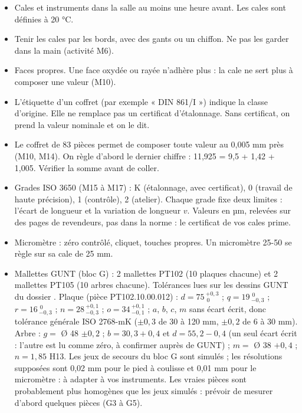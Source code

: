 \documentclass[10pt,a4paper]{article}
\begin{document}
\begin{itemize}
\item Cales et instruments dans la salle au moins une heure avant. Les cales sont définies à 20 °C.
\item Tenir les cales par les bords, avec des gants ou un chiffon. Ne pas les garder dans la main (activité M6).
\item Faces propres. Une face oxydée ou rayée n'adhère plus : la cale ne sert plus à composer une valeur (M10).
\item L'étiquette d'un coffret (par exemple « DIN 861/I ») indique la classe d'origine. Elle ne remplace pas un certificat d'étalonnage. Sans certificat, on prend la valeur nominale et on le dit.
\item Le coffret de 83 pièces permet de composer toute valeur au 0,005 mm près (M10, M14). On règle d'abord le dernier chiffre : 11,925 = 9,5 + 1,42 + 1,005. Vérifier la somme avant de coller.
\item Grades ISO 3650 (M15 à M17) : K (étalonnage, avec certificat), 0 (travail de haute précision), 1 (contrôle), 2 (atelier). Chaque grade fixe deux limites : l'écart de longueur et la variation de longueur $v$. Valeurs en µm, relevées sur des pages de revendeurs, pas dans la norme : le certificat de vos cales prime.
\item Micromètre : zéro contrôlé, cliquet, touches propres. Un micromètre 25-50 se règle sur sa cale de 25 mm.
\item Mallettes GUNT (bloc G) : 2 mallettes PT102 (10 plaques chacune) et 2 mallettes PT105 (10 arbres chacune). Tolérances lues sur les dessins GUNT du dossier . Plaque (pièce PT102.10.00.012) : $d = 75\,{}^{+0,3}_{\,0}$ ; $q = 19\,{}^{\,0}_{-0,3}$ ; $r = 16\,{}^{\,0}_{-0,3}$ ; $n = 28\,{}^{+0,1}_{-0,3}$ ; $o = 34\,{}^{+0,1}_{-0,1}$ ; $a$, $b$, $c$, $m$ sans écart écrit, donc tolérance générale ISO 2768-mK ($\pm 0{,}3$ de 30 à 120 mm, $\pm 0{,}2$ de 6 à 30 mm). Arbre : $g =$ Ø 48 $\pm 0{,}2$ ; $b = 30{,}3 + 0{,}4$ et $d = 55{,}2 - 0{,}4$ (un seul écart écrit : l'autre est lu comme zéro, à confirmer auprès de GUNT) ; $m =$ Ø 38 $+ 0{,}4$ ; $n = 1{,}85$ H13. Les jeux de secours du bloc G sont simulés ; les résolutions supposées sont 0,02 mm pour le pied à coulisse et 0,01 mm pour le micromètre : à adapter à vos instruments. Les vraies pièces sont probablement plus homogènes que les jeux simulés : prévoir de mesurer d'abord quelques pièces (G3 à G5).
\end{itemize}
\end{document}
